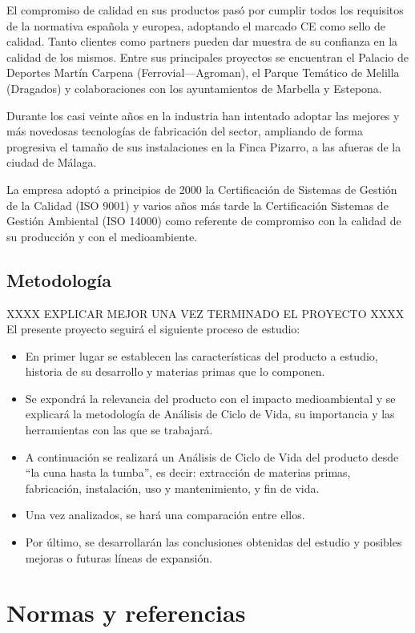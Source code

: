 El compromiso de calidad en sus productos pasó por cumplir todos los requisitos de la normativa española y europea, adoptando el marcado CE como sello de calidad. Tanto clientes como partners pueden dar muestra de su confianza en la calidad de los mismos. Entre sus principales proyectos se encuentran el Palacio de Deportes Martín Carpena (Ferrovial—Agroman), el Parque Temático de Melilla (Dragados) y colaboraciones con los ayuntamientos de Marbella y Estepona.

Durante los casi veinte años en la industria han intentado adoptar las mejores y más novedosas tecnologías de fabricación del sector, ampliando de forma progresiva el tamaño de sus instalaciones en la Finca Pizarro, a las afueras de la ciudad de Málaga.

La empresa adoptó a principios de 2000 la Certificación de Sistemas de Gestión de la Calidad (ISO 9001) y varios años más tarde la Certificación Sistemas de Gestión Ambiental (ISO 14000) como referente de compromiso con la calidad de su producción y con el medioambiente.

\section{Metodología}

XXXX EXPLICAR MEJOR UNA VEZ TERMINADO EL PROYECTO XXXX
El presente proyecto seguirá el siguiente proceso de estudio:

\begin{itemize}
  \item En primer lugar se establecen las características del producto a estudio, historia de su desarrollo y materias primas que lo componen.
  \item Se expondrá la relevancia del producto con el impacto medioambiental y se explicará la metodología de Análisis de Ciclo de Vida, su importancia y las herramientas con las que se trabajará.
  \item A continuación se realizará un Análisis de Ciclo de Vida del producto desde ``la cuna hasta la tumba'', es decir: extracción de materias primas, fabricación, instalación, uso y mantenimiento, y fin de vida.
  \item Una vez analizados, se hará una comparación entre ellos.
  \item Por último, se desarrollarán las conclusiones obtenidas del estudio y posibles mejoras o futuras líneas de expansión.
\end{itemize}

\chapter{Normas y referencias}

